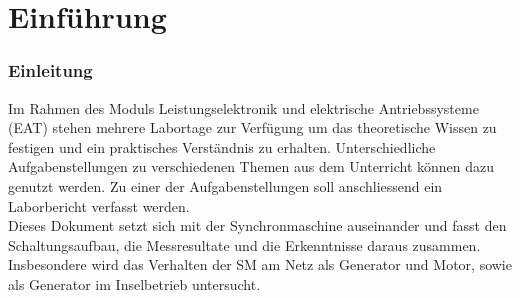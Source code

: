 


\tableofcontents

\newpage
\part{Einführung}

\section*{Einleitung}
Im Rahmen des Moduls Leistungselektronik und elektrische Antriebssysteme (EAT) stehen mehrere Labortage zur Verfügung um das theoretische Wissen zu festigen und ein praktisches Verständnis zu erhalten. 
Unterschiedliche Aufgabenstellungen zu verschiedenen Themen aus dem Unterricht können dazu genutzt werden.
Zu einer der Aufgabenstellungen soll anschliessend ein Laborbericht verfasst werden.\\

Dieses Dokument setzt sich mit der Synchronmaschine auseinander und fasst den Schaltungsaufbau, die Messresultate und die Erkenntnisse daraus zusammen.\\
Insbesondere wird das Verhalten der SM am Netz als Generator und Motor, sowie als Generator im Inselbetrieb untersucht.




